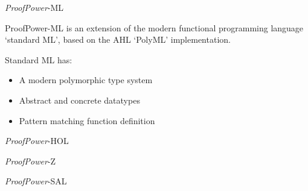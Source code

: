 \begin{slide}{}
\begin{center}
{\Large {\it ProofPower}-ML}

ProofPower-ML is an extension of the modern functional programming language `standard ML', based on the AHL `PolyML' implementation.

\end{center}

Standard ML has:

\begin{itemize}
\item
A modern polymorphic type system
\item
Abstract and concrete datatypes
\item
Pattern matching function definition

\end{itemize}
\end{slide}

\begin{slide}{}
\begin{center}
{\Large {\it ProofPower}-HOL}

\end{center}
\end{slide}

\begin{slide}{}
\begin{center}
{\Large {\it ProofPower}-Z}

\end{center}
\end{slide}

\begin{slide}{}
\begin{center}
{\Large {\it ProofPower}-SAL}

\end{center}
\end{slide}

